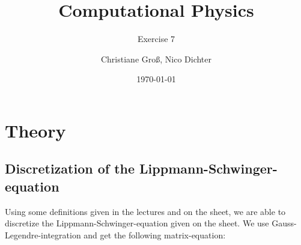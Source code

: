 \documentclass{scrartcl}
\title{Computational Physics}
\subtitle{Exercise 7}
\date{\today}
\author{Christiane Groß, Nico Dichter}
\begin{document}
	\maketitle
	
\section{Theory}

\subsection{Discretization of the Lippmann-Schwinger-equation}

Using some definitions given in the lectures and on the sheet, we are able to discretize the Lippmann-Schwinger-equation given on the sheet. We use Gauss-Legendre-integration and get the following matrix-equation:
\end{document}
